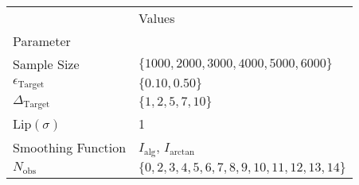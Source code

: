 \begin{tabular}{ll}
 & Values \\
Parameter &  \\
Sample Size & $\{ 1000, 2000, 3000, 4000, 5000, 6000 \}$ \\
\cline{1-2}
$\epsilon_{{\text{{Target}}}}$ & $\{ 0.10, 0.50 \}$ \\
\cline{1-2}
$\Delta_{{\text{{Target}}}}$ & $\{ 1, 2, 5, 7, 10 \}$ \\
\cline{1-2}
Lip$(\sigma)$ & 1 \\
\cline{1-2}
Smoothing Function & $I_\text{alg}$, $I_\text{arctan}$ \\
\cline{1-2}
$N_{{ \text{{obs}} }}$ & $\{ 0, 2, 3, 4, 5, 6, 7, 8, 9, 10, 11, 12, 13, 14 \}$ \\
\cline{1-2}
\end{tabular}

